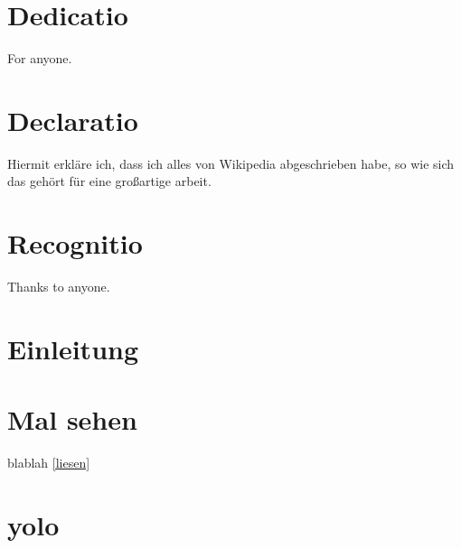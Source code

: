 \documentclass[12pt, twoside]{report} %
\begin{document}


\chapter*{Dedicatio}
For anyone.

\chapter*{Declaratio}
Hiermit erkläre ich, dass ich alles von Wikipedia abgeschrieben habe, so
wie sich das gehört für eine großartige arbeit.

\chapter*{Recognitio}
Thanks to anyone.

\tableofcontents

\chapter{Einleitung}


\chapter{Mal sehen}
blablah \ref{liesen}



\appendix
\chapter{yolo}


\printbibliography
\end{document}
